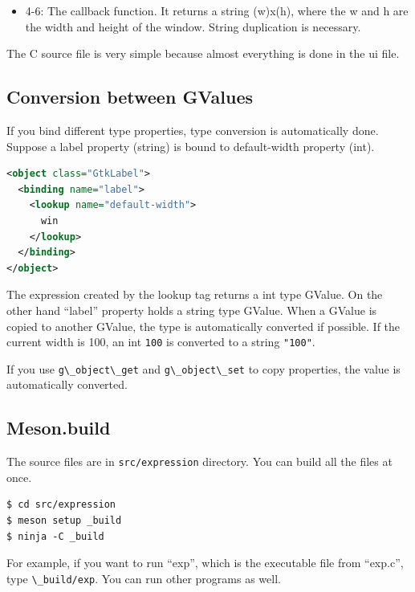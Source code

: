 \begin{itemize}
\tightlist
\item
  4-6: The callback function. It returns a string (w)x(h), where the w
  and h are the width and height of the window. String duplication is
  necessary.
\end{itemize}

The C source file is very simple because almost everything is done in
the ui file.

\subsection{Conversion between
GValues}\label{conversion-between-gvalues}

If you bind different type properties, type conversion is automatically
done. Suppose a label property (string) is bound to default-width
property (int).

\begin{lstlisting}[language=XML]
<object class="GtkLabel">
  <binding name="label">
    <lookup name="default-width">
      win
    </lookup>
  </binding>
</object>
\end{lstlisting}

The expression created by the lookup tag returns a int type GValue. On
the other hand ``label'' property holds a string type GValue. When a
GValue is copied to another GValue, the type is automatically converted
if possible. If the current width is 100, an int
\passthrough{\lstinline!100!} is converted to a string
\passthrough{\lstinline!"100"!}.

If you use \passthrough{\lstinline!g\_object\_get!} and
\passthrough{\lstinline!g\_object\_set!} to copy properties, the value
is automatically converted.

\subsection{Meson.build}\label{meson.build}

The source files are in \passthrough{\lstinline!src/expression!}
directory. You can build all the files at once.

\begin{lstlisting}
$ cd src/expression
$ meson setup _build
$ ninja -C _build
\end{lstlisting}

For example, if you want to run ``exp'', which is the executable file
from ``exp.c'', type \passthrough{\lstinline!\_build/exp!}. You can run
other programs as well.

